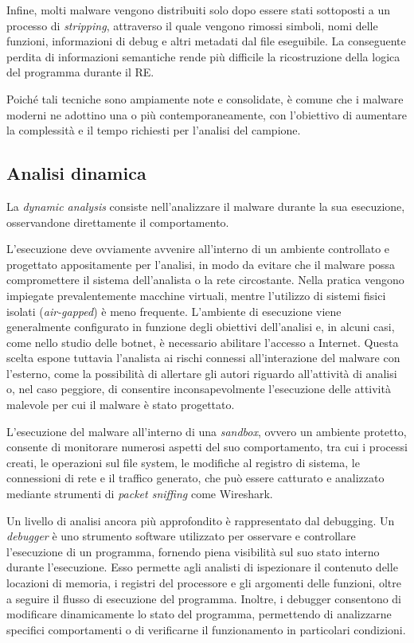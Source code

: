Infine, molti malware vengono distribuiti solo dopo essere stati sottoposti a un processo di \textit{stripping}, attraverso il quale vengono rimossi simboli, nomi delle funzioni, informazioni di debug e altri metadati dal file eseguibile. La conseguente perdita di informazioni semantiche rende più difficile la ricostruzione della logica del programma durante il RE.

Poiché tali tecniche sono ampiamente note e consolidate, è comune che i malware moderni ne adottino una o più contemporaneamente, con l'obiettivo di aumentare la complessità e il tempo richiesti per l'analisi del campione.

\subsection{Analisi dinamica} %

La \textit{dynamic analysis} consiste nell'analizzare il malware durante la sua esecuzione, osservandone direttamente il comportamento.

L'esecuzione deve ovviamente avvenire all'interno di un ambiente controllato e progettato appositamente per l'analisi, in modo da evitare che il malware possa compromettere il sistema dell'analista o la rete circostante. Nella pratica vengono impiegate prevalentemente macchine virtuali, mentre l'utilizzo di sistemi fisici isolati (\textit{air-gapped}) è meno frequente. L'ambiente di esecuzione viene generalmente configurato in funzione degli obiettivi dell'analisi e, in alcuni casi, come nello studio delle botnet, è necessario abilitare l'accesso a Internet. Questa scelta espone tuttavia l'analista ai rischi connessi all'interazione del malware con l'esterno, come la possibilità di allertare gli autori riguardo all'attività di analisi o, nel caso peggiore, di consentire inconsapevolmente l'esecuzione delle attività malevole per cui il malware è stato progettato.

L'esecuzione del malware all'interno di una \textit{sandbox}, ovvero un ambiente protetto, consente di monitorare numerosi aspetti del suo comportamento, tra cui i processi creati, le operazioni sul file system, le modifiche al registro di sistema, le connessioni di rete e il traffico generato, che può essere catturato e analizzato mediante strumenti di \textit{packet sniffing} come Wireshark.

Un livello di analisi ancora più approfondito è rappresentato dal debugging. Un \textit{debugger} è uno strumento software utilizzato per osservare e controllare l'esecuzione di un programma, fornendo piena visibilità sul suo stato interno durante l'esecuzione. Esso permette agli analisti di ispezionare il contenuto delle locazioni di memoria, i registri del processore e gli argomenti delle funzioni, oltre a seguire il flusso di esecuzione del programma. Inoltre, i debugger consentono di modificare dinamicamente lo stato del programma, permettendo di analizzarne specifici comportamenti o di verificarne il funzionamento in particolari condizioni.

